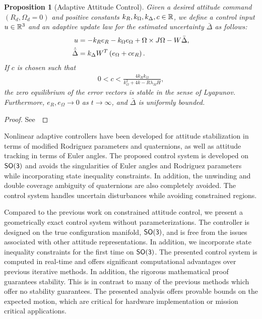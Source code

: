 \documentclass[fleqn]{IJCAS}  %
\newtheorem{prop}{Proposition}
\begin{document}
\begin{multicols}{2}
\begin{prop}[Adaptive Attitude Control]\label{prop:adaptive_control}
Given  a desired attitude command \( (R_d, \Omega_d = 0 )\) and positive constants \( k_R, k_\Omega, k_\Delta, c \in \mathbb{R} \), we define a control input \( u \in \mathbb{R}^3\) and an adaptive update law for the estimated uncertainty \( \bar{\Delta} \) as follows:
\begin{align}
	u &= - k_R e_R - k_\Omega e_\Omega + \Omega \times J \Omega - W \bar{\Delta} , \label{eqn:adaptive_control} \\
	\dot{\bar{\Delta}} &= k_\Delta W^T \left( e_\Omega + c e_R \right) . \label{eqn:delta_dot}
\end{align}
If \( c \) is chosen such that
\begin{gather}
	0 < c < \frac{4 k_R k_\Omega}{k_\Omega^2 + 4 k-R \lambda_M H} , \label{eqn:c_bound}
\end{gather}
  the zero equilibrium of the error vectors is stable in the sense of Lyapunov. Furthermore, $e_R,e_\Omega\rightarrow 0$ as $t\rightarrow\infty$, and $\bar\Delta$ is uniformly bounded.
\end{prop}
\begin{proof}
See~
\end{proof}

Nonlinear adaptive controllers have been developed for attitude stabilization in terms of modified Rodriguez parameters and quaternions, as well as attitude tracking in terms of Euler angles. 
The proposed control system is developed on \(\mathsf{SO(3)}\) and avoids the singularities of Euler angles and Rodriguez parameters while incorporating state inequality constraints. 
In addition, the unwinding and double coverage ambiguity of quaternions are also completely avoided. 
The control system handles uncertain disturbances while avoiding constrained regions.

Compared to the previous work on constrained attitude control, we present a geometrically exact control system without parameterizations.
The controller is designed on the true configuration manifold, \( \mathsf{SO(3)} \), and is free from the issues associated with other attitude representations.
In addition, we incorporate state inequality constraints for the first time on \( \mathsf{SO(3)} \).
The presented control system is computed in real-time and offers significant computational advantages over previous iterative methods. 
In addition, the rigorous mathematical proof guarantees stability.
This is in contrast to many of the previous methods which offer no stability guarantees.
The presented analysis offers provable bounds on the expected motion, which are critical for hardware implementation or mission critical applications.


\end{multicols}
\end{document}
